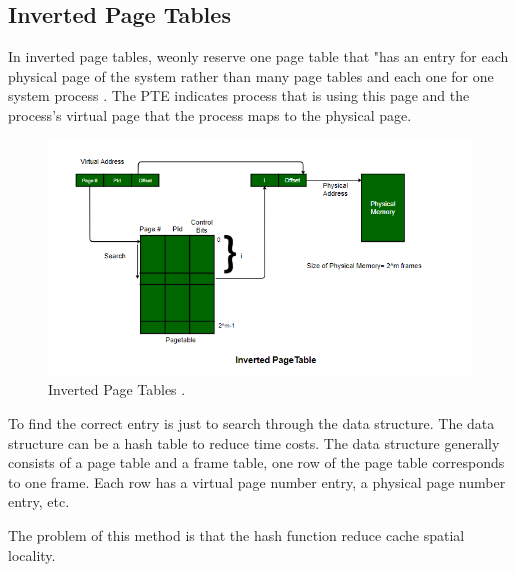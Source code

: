 \documentclass[a4paper]{article}
\begin{document}
\subsection{Inverted Page Tables}
In inverted page tables, weonly reserve one page table that "has an entry for each physical page of the system rather than many page tables and each one for one system process \cite{ostep}. The PTE indicates process that is using this page and the process's virtual page that the process maps to the physical page.
\begin{figure}[H]
    \centering
    \includegraphics[width=1\textwidth]{3.png}
    \caption{Inverted Page Tables \cite{ipt}.}
\end{figure}
To find the correct entry is just to search through the data structure. The data structure can be a hash table to reduce time costs. The data structure generally consists of a page table and a frame table, one row of the page table corresponds to one frame. Each row has a virtual page number entry, a physical page number entry, etc.

The problem of this method is that the hash function reduce cache spatial locality.
\end{document}
